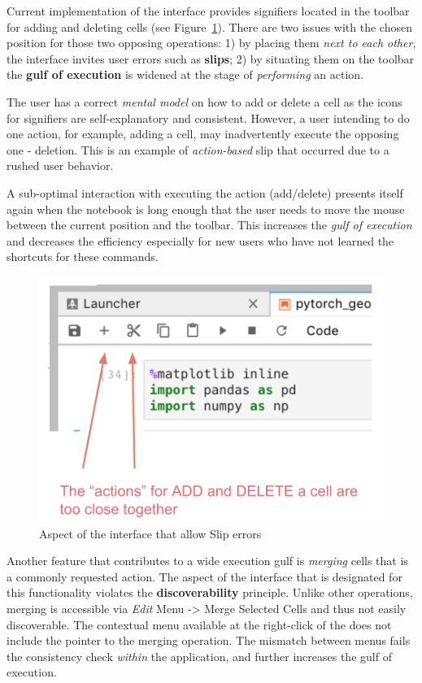 \documentclass[12pt,letterpaper]{article}
\begin{document}
Current implementation of the interface provides signifiers located in the toolbar for adding and deleting cells (see Figure~\ref{fig::2}). There are two issues with the chosen position for those two opposing operations: 1) by placing them \textit{next to each other}, the interface invites user errors such as \textbf{slips}; 2) by situating them on the toolbar the \textbf{gulf of execution} is widened at the stage of \textit{performing} an action.

The user has a correct \textit{mental model} on how to add or delete a cell as the icons for signifiers are self-explanatory and consistent. However, a user intending to do one action, for example, adding a cell, may inadvertently execute the opposing one - deletion. This is an example of \textit{action-based} slip that occurred due to a rushed user behavior. 

A sub-optimal interaction with executing the action (add/delete) presents itself again when the notebook is long enough that the user needs to move the mouse between the current position and the toolbar. This increases the \textit{gulf of execution} and decreases the efficiency especially for new users who have not learned the shortcuts for these commands.  

\begin{figure}[h]
\centering
\includegraphics[scale=.4]{figures/project-principles/jupyter_add_delete.png}
\caption{Aspect of the interface that allow Slip errors}
\label{fig::2}
\end{figure}

Another feature that contributes to a wide execution gulf is \textit{merging} cells that is a commonly requested action. The aspect of the interface that is designated for this functionality violates the \textbf{discoverability} principle. Unlike other operations, merging is accessible via \textit{Edit} Menu -> Merge Selected Cells and thus not easily discoverable. The contextual menu available at the right-click of the does not include the pointer to the merging operation. The mismatch between menus fails the consistency check \textit{within} the application, and further increases the gulf of execution. 
\end{document}
